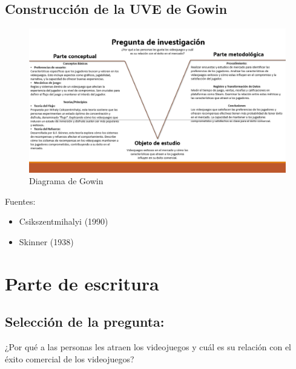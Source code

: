 \documentclass[
  letterpaper,
  DIV=11,
  numbers=noendperiod]{scrreprt}
\begin{document}
\hypertarget{construcciuxf3n-de-la-uve-de-gowin}{%
\section{Construcción de la UVE de
Gowin}\label{construcciuxf3n-de-la-uve-de-gowin}}

\begin{figure}

{\centering \includegraphics{./imagenes/V-de-gowin.png}

}

\caption{Diagrama de Gowin}

\end{figure}

Fuentes:

\begin{itemize}
\item
  Csikszentmihalyi (1990)
\item
  Skinner (1938)
\end{itemize}


\hypertarget{parte-de-escritura}{%
\chapter{Parte de escritura}\label{parte-de-escritura}}

\hypertarget{selecciuxf3n-de-la-pregunta}{%
\section{Selección de la pregunta:}\label{selecciuxf3n-de-la-pregunta}}

¿Por qué a las personas les atraen los videojuegos y cuál es su relación
con el éxito comercial de los videojuegos?
\end{document}
